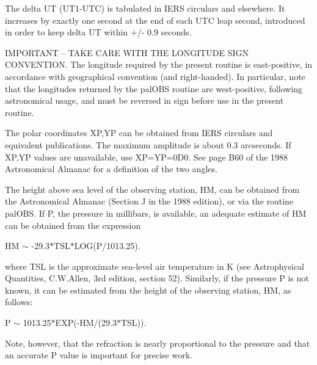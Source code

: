 \documentclass[twoside,11pt,nolof]{starlink}
\begin{document}
{{{         \sstitem
          The delta UT (UT1-UTC) is tabulated in IERS circulars and
         elsewhere.  It increases by exactly one second at the end of
         each UTC leap second, introduced in order to keep delta UT
         within $+$/- 0.9 seconds.

         \sstitem
          IMPORTANT -- TAKE CARE WITH THE LONGITUDE SIGN CONVENTION.
         The longitude required by the present routine is east-positive,
         in accordance with geographical convention (and right-handed).
         In particular, note that the longitudes returned by the
         palOBS routine are west-positive, following astronomical
         usage, and must be reversed in sign before use in the present
         routine.

         \sstitem
          The polar coordinates XP,YP can be obtained from IERS
         circulars and equivalent publications.  The maximum amplitude
         is about 0.3 arcseconds.  If XP,YP values are unavailable,
         use XP=YP=0D0.  See page B60 of the 1988 Astronomical Almanac
         for a definition of the two angles.

         \sstitem
          The height above sea level of the observing station, HM,
         can be obtained from the Astronomical Almanac (Section J
         in the 1988 edition), or via the routine palOBS.  If P,
         the pressure in millibars, is available, an adequate
         estimate of HM can be obtained from the expression

      }
             HM $\sim$ -29.3$*$TSL$*$LOG(P/1013.25).

      where TSL is the approximate sea-level air temperature in K
      (see Astrophysical Quantities, C.W.Allen, 3rd edition,
      section 52).  Similarly, if the pressure P is not known,
      it can be estimated from the height of the observing
      station, HM, as follows:

             P $\sim$ 1013.25$*$EXP(-HM/(29.3$*$TSL)).

      Note, however, that the refraction is nearly proportional to the
      pressure and that an accurate P value is important for precise
      work.

   }
}
\end{document}
